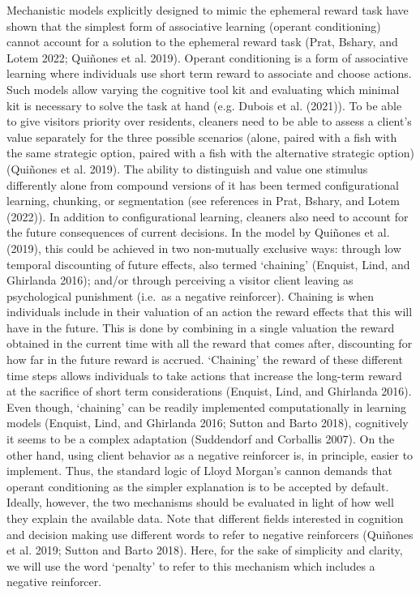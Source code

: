 \documentclass[
  12pt,
]{article}
\begin{document}
Mechanistic models explicitly designed to mimic the ephemeral reward
task have shown that the simplest form of associative learning (operant
conditioning) cannot account for a solution to the ephemeral reward task
(Prat, Bshary, and Lotem 2022; Quiñones et al. 2019). Operant
conditioning is a form of associative learning where individuals use
short term reward to associate and choose actions. Such models allow
varying the cognitive tool kit and evaluating which minimal kit is
necessary to solve the task at hand (e.g. Dubois et al. (2021)). To be
able to give visitors priority over residents, cleaners need to be able
to assess a client's value separately for the three possible scenarios
(alone, paired with a fish with the same strategic option, paired with a
fish with the alternative strategic option) (Quiñones et al. 2019). The
ability to distinguish and value one stimulus differently alone from
compound versions of it has been termed configurational learning,
chunking, or segmentation (see references in Prat, Bshary, and Lotem
(2022)). In addition to configurational learning, cleaners also need to
account for the future consequences of current decisions. In the model
by Quiñones et al. (2019), this could be achieved in two non-mutually
exclusive ways: through low temporal discounting of future effects, also
termed `chaining' (Enquist, Lind, and Ghirlanda 2016); and/or through
perceiving a visitor client leaving as psychological punishment (i.e.~as
a negative reinforcer). Chaining is when individuals include in their
valuation of an action the reward effects that this will have in the
future. This is done by combining in a single valuation the reward
obtained in the current time with all the reward that comes after,
discounting for how far in the future reward is accrued. `Chaining' the
reward of these different time steps allows individuals to take actions
that increase the long-term reward at the sacrifice of short term
considerations (Enquist, Lind, and Ghirlanda 2016). Even though,
`chaining' can be readily implemented computationally in learning models
(Enquist, Lind, and Ghirlanda 2016; Sutton and Barto 2018), cognitively
it seems to be a complex adaptation (Suddendorf and Corballis 2007). On
the other hand, using client behavior as a negative reinforcer is, in
principle, easier to implement. Thus, the standard logic of Lloyd
Morgan's cannon demands that operant conditioning as the simpler
explanation is to be accepted by default. Ideally, however, the two
mechanisms should be evaluated in light of how well they explain the
available data. Note that different fields interested in cognition and
decision making use different words to refer to negative reinforcers
(Quiñones et al. 2019; Sutton and Barto 2018). Here, for the sake of
simplicity and clarity, we will use the word `penalty' to refer to this
mechanism which includes a negative reinforcer.
\end{document}
